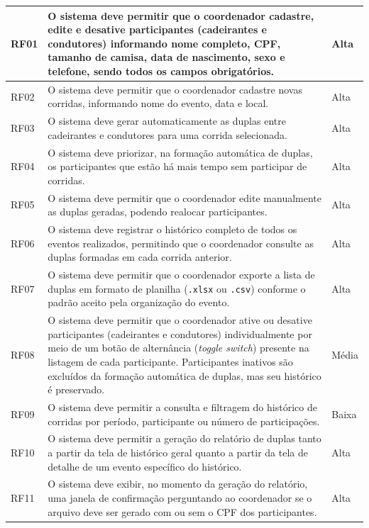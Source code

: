 \documentclass[12pt,a4paper]{article}
\begin{document}
\begin{longtable}{|L{1.5cm}|L{9cm}|L{2.5cm}|}
        RF01 & O sistema deve permitir que o coordenador cadastre, edite e desative participantes (cadeirantes e condutores) informando nome completo, CPF, tamanho de camisa, data de nascimento, sexo e telefone, sendo todos os campos obrigatórios.
              & Alta \\ \hline
        RF02 & O sistema deve permitir que o coordenador cadastre novas corridas, informando nome do evento, data e local.
              & Alta \\ \hline
        RF03 & O sistema deve gerar automaticamente as duplas entre cadeirantes e condutores para uma corrida selecionada.
              & Alta \\ \hline
        RF04 & O sistema deve priorizar, na formação automática de duplas, os participantes que estão há mais tempo sem participar de corridas.
              & Alta \\ \hline
        RF05 & O sistema deve permitir que o coordenador edite manualmente as duplas geradas, podendo realocar participantes.
              & Alta \\ \hline
        RF06 & O sistema deve registrar o histórico completo de todos os eventos realizados, permitindo que o coordenador consulte as duplas formadas em cada corrida anterior. 
              & Alta \\ \hline
        RF07 & O sistema deve permitir que o coordenador exporte a lista de duplas em formato de planilha (\texttt{.xlsx} ou \texttt{.csv}) conforme o padrão aceito pela organização do evento.
              & Alta \\ \hline
        RF08 & O sistema deve permitir que o coordenador ative ou desative participantes (cadeirantes e condutores) individualmente por meio de um botão de alternância (\textit{toggle switch}) presente na listagem de cada participante. Participantes inativos são excluídos da formação automática de duplas, mas seu histórico é preservado.
              & Média \\ \hline
        RF09 & O sistema deve permitir a consulta e filtragem do histórico de corridas por período, participante ou número de participações.
              & Baixa \\ \hline
        RF10 & O sistema deve permitir a geração do relatório de duplas tanto a partir da tela de histórico geral quanto a partir da tela de detalhe de um evento específico do histórico. 
              & Alta \\ \hline
        RF11 & O sistema deve exibir, no momento da geração do relatório, uma janela de confirmação perguntando ao coordenador se o arquivo deve ser gerado com ou sem o CPF dos participantes.       & Alta \\ \hline

\end{longtable}
\end{document}

